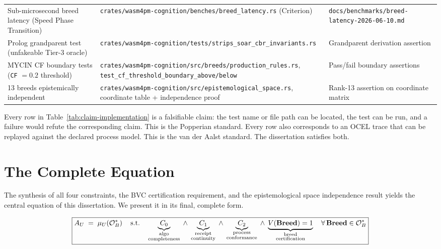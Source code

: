 \begin{table}[h]
\begin{tabular}{p{5.5cm}p{5.5cm}p{3.5cm}}
Sub-microsecond breed latency (Speed Phase Transition)
  & \texttt{crates/wasm4pm-cognition/benches/breed\_latency.rs} (Criterion)
  & \texttt{docs/benchmarks/breed-latency-2026-06-10.md} \\[4pt]

Prolog grandparent test (unfakeable Tier-3 oracle)
  & \texttt{crates/wasm4pm-cognition/tests/strips\_soar\_cbr\_invariants.rs}
  & Grandparent derivation assertion \\[4pt]

MYCIN CF boundary tests (\texttt{CF} $= 0.2$ threshold)
  & \texttt{crates/wasm4pm-cognition/src/breeds/production\_rules.rs},
    \texttt{test\_cf\_threshold\_boundary\_above/below}
  & Pass/fail boundary assertions \\[4pt]

13 breeds epistemically independent
  & \texttt{crates/wasm4pm-cognition/src/epistemological\_space.rs},
    coordinate table + independence proof
  & Rank-13 assertion on coordinate matrix \\[4pt]

\end{tabular}
\end{table}

Every row in Table~\ref{tab:claim-implementation} is a falsifiable claim: the test name
or file path can be located, the test can be run, and a failure would refute the
corresponding claim. This is the Popperian standard. Every row also corresponds to an OCEL
trace that can be replayed against the declared process model. This is the van der Aalst
standard. The dissertation satisfies both.

\section{The Complete Equation}
\label{sec:complete-equation}

The synthesis of all four constraints, the BVC certification requirement, and the
epistemological space independence result yields the central equation of this dissertation.
We present it in its final, complete form.

\begin{equation}
\label{eq:complete-equation-final}
\boxed{
  A_U \;=\; \mu_U\!\left(\mathcal{O}^*_B\right)
  \quad \text{s.t.} \quad
  \underbrace{C_0}_{\substack{\text{algo}\\\text{completeness}}}
  \;\wedge\;
  \underbrace{C_1}_{\substack{\text{receipt}\\\text{continuity}}}
  \;\wedge\;
  \underbrace{C_2}_{\substack{\text{process}\\\text{conformance}}}
  \;\wedge\;
  \underbrace{V(\mathbf{Breed}) = 1}_{\substack{\text{breed}\\\text{certification}}}
  \quad \forall\, \mathbf{Breed} \in \mathcal{O}^*_B
}
\end{equation}

